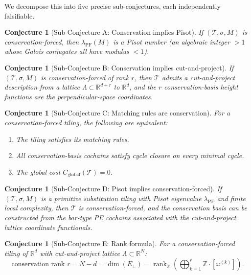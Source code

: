 \documentclass[12pt]{article}
\newtheorem{conjecture}[theorem]{Conjecture}
\theoremstyle{definition}
\theoremstyle{remark}
\newcommand{\RR}{\mathbb{R}}
\newcommand{\ZZ}{\mathbb{Z}}
\DeclareMathOperator{\rank}{rank}
\DeclareMathOperator{\PF}{PF}
\begin{document}
We decompose this into five precise sub-conjectures, each independently falsifiable.

\begin{conjecture}[Sub-Conjecture A: Conservation implies Pisot]
\label{conj:A}
If $(\mathcal{T}, \sigma, M)$ is conservation-forced, then $\lambda_\PF(M)$ is a Pisot number (an algebraic integer $> 1$ whose Galois conjugates all have modulus $< 1$).
\end{conjecture}

\begin{conjecture}[Sub-Conjecture B: Conservation implies cut-and-project]
\label{conj:B}
If $(\mathcal{T}, \sigma, M)$ is conservation-forced of rank $r$, then $\mathcal{T}$ admits a cut-and-project description from a lattice $\Lambda \subset \RR^{d+r}$ to $\RR^d$, and the $r$ conservation-basis height functions are the perpendicular-space coordinates.
\end{conjecture}

\begin{conjecture}[Sub-Conjecture C: Matching rules are conservation]
\label{conj:C}
For a conservation-forced tiling, the following are equivalent:
\begin{enumerate}
\item[(i)] The tiling satisfies its matching rules.
\item[(ii)] All conservation-basis cochains satisfy cycle closure on every minimal cycle.
\item[(iii)] The global cost $C_{\mathrm{global}}(\mathcal{T}) = 0$.
\end{enumerate}
\end{conjecture}

\begin{conjecture}[Sub-Conjecture D: Pisot implies conservation-forced]
\label{conj:D}
If $(\mathcal{T}, \sigma, M)$ is a primitive substitution tiling with Pisot eigenvalue $\lambda_\PF$ and finite local complexity, then $\mathcal{T}$ is conservation-forced, and the conservation basis can be constructed from the bar-type PE cochains associated with the cut-and-project lattice coordinate functionals.
\end{conjecture}

\begin{conjecture}[Sub-Conjecture E: Rank formula]
\label{conj:E}
For a conservation-forced tiling of $\RR^d$ with cut-and-project lattice $\Lambda \subset \RR^N$:
\begin{equation}
\text{conservation rank } r = N - d = \dim(E_\perp) = \rank_\ZZ\!\left(\bigoplus_{k=1}^r \ZZ \cdot [\omega^{(k)}]\right).
\end{equation}
\end{conjecture}
\end{document}
